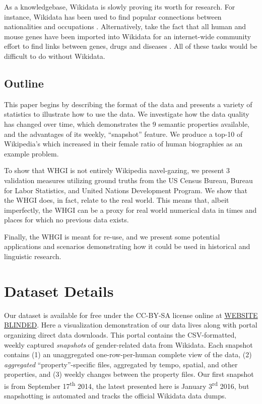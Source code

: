 \documentclass[letterpaper]{article}
\begin{document}
As a knowledgebase, Wikidata is slowly proving its worth for research. For instance, Wikidata has been used to find popular connections between nationalities and occupations \cite{goldfarb_quantifying_2015}. Alternatively, take the fact that all human and mouse genes have been imported into Wikidata \cite{mitraka_wikidata:_2015} for an internet-wide community effort to find links between genes, drugs and diseases \cite{burgstaller-muehlbacher_wikidata_2015}. All of these tasks would be difficult to do without Wikidata.

\subsection{Outline}

This paper begins by describing the format of the data and presents a variety of statistics to illustrate how to use the data. We investigate how the data quality has changed over time, which demonstrates the 9 semantic properties available, and the advantages of its weekly, ``snapshot'' feature. We produce a top-10 of Wikipedia's which increased in their female ratio of human biographies as an example problem.

To show that WHGI is not entirely Wikipedia navel-gazing, we present 3 validation measures utilizing ground truths from the US Census Bureau, Bureau for Labor Statistics, and United Nations Development Program. We show that the WHGI does, in fact, relate to the real world. This means that, albeit imperfectly, the WHGI can be a proxy for real world numerical data in times and places for which no previous data exists.

Finally, the WHGI is meant for re-use, and we present some potential applications and scenarios demonstrating how it could be used in historical and linguistic research.

\section{Dataset Details}

Our dataset is available for free under the CC-BY-SA license online at  \url{WEBSITE BLINDED}. Here a visualization demonstration of our data lives along with portal organizing direct data downloads. 	This portal contains the CSV-formatted, weekly captured \textit{snapshots} of gender-related data from Wikidata. Each snapshot contains (1) an unaggregated one-row-per-human complete view of the data, (2) \textit{aggregated} ``property''-specific files, aggregated by tempo, spatial, and other properties, and (3) weekly changes between the property files. Our first snapshot is from September 17\textsuperscript{th} 2014, the latest presented here is January 3\textsuperscript{rd} 2016, but snapshotting is automated and tracks the official Wikidata data dumps.
\end{document}
